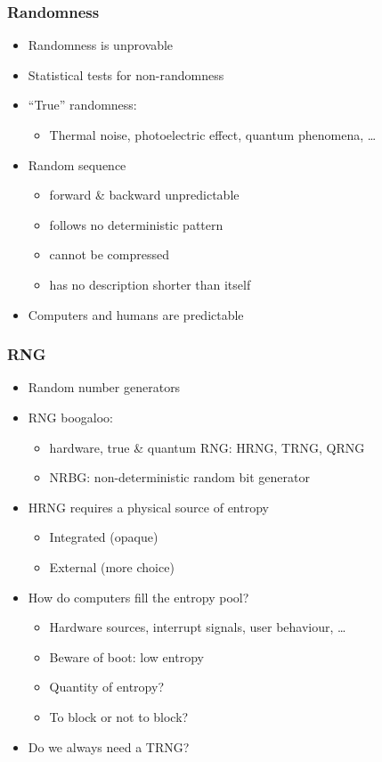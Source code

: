 \begin{frame}
  \frametitle{Randomness}

  \begin{itemize}[<+->]
    \item Randomness is unprovable
    \item Statistical tests for non-randomness
    \item \enquote{True} randomness:
    \begin{itemize}
      \item Thermal noise, photoelectric effect, quantum phenomena, \dots
    \end{itemize}
    \vspace*{1em}
    \item Random sequence
    \begin{itemize}
      \item forward \& backward unpredictable
      \item follows no deterministic pattern
      \item cannot be compressed
      \item has no description shorter than itself
    \end{itemize}
    \vspace*{1em}
    \item Computers and humans are predictable
  \end{itemize}
\end{frame}

\begin{frame}
  \frametitle{RNG}

  \begin{itemize}[<+->]
    \item Random number generators
    \item RNG boogaloo:
    \begin{itemize}
      \item hardware, true \& quantum RNG: HRNG, TRNG, QRNG
      \item NRBG: non-deterministic random bit generator
    \end{itemize}
    \item HRNG requires a physical source of entropy
    \begin{itemize}
      \item Integrated (opaque)
      \item External (more choice)
    \end{itemize}
    \item How do computers fill the entropy pool?
    \begin{itemize}
      \item Hardware sources, interrupt signals, user behaviour, \dots
      \item Beware of boot: low entropy
      \item Quantity of entropy?
      \item To block or not to block?
    \end{itemize}
    \item Do we always need a TRNG?
  \end{itemize}
\end{frame}


